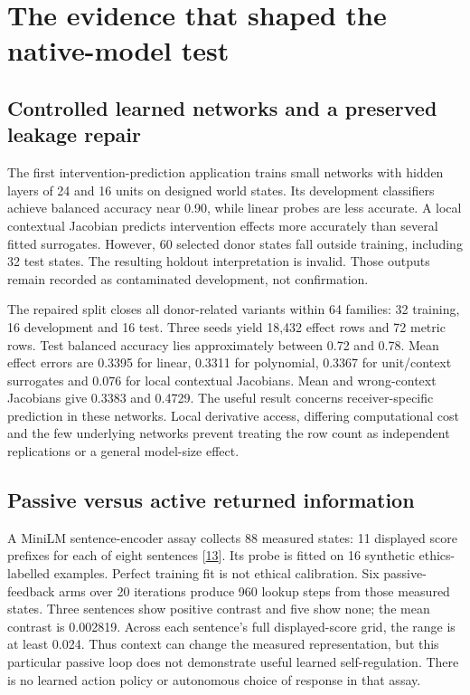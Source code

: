 \documentclass[11pt,letterpaper]{article}
\begin{document}
\section{The evidence that shaped the native-model test}

\subsection{Controlled learned networks and a preserved leakage repair}

The first intervention-prediction application trains small networks with hidden layers of 24 and 16 units on designed world states. Its development classifiers achieve balanced accuracy near 0.90, while linear probes are less accurate. A local contextual Jacobian predicts intervention effects more accurately than several fitted surrogates. However, 60 selected donor states fall outside training, including 32 test states. The resulting holdout interpretation is invalid. Those outputs remain recorded as contaminated development, not confirmation.

The repaired split closes all donor-related variants within 64 families: 32 training, 16 development and 16 test. Three seeds yield 18,432 effect rows and 72 metric rows. Test balanced accuracy lies approximately between 0.72 and 0.78. Mean effect errors are 0.3395 for linear, 0.3311 for polynomial, 0.3367 for unit/context surrogates and 0.076 for local contextual Jacobians. Mean and wrong-context Jacobians give 0.3383 and 0.4729. The useful result concerns receiver-specific prediction in these networks. Local derivative access, differing computational cost and the few underlying networks prevent treating the row count as independent replications or a general model-size effect.

\subsection{Passive versus active returned information}

A MiniLM sentence-encoder assay collects 88 measured states: 11 displayed score prefixes for each of eight sentences [\hyperref[ref:13]{13}]. Its probe is fitted on 16 synthetic ethics-labelled examples. Perfect training fit is not ethical calibration. Six passive-feedback arms over 20 iterations produce 960 lookup steps from those measured states. Three sentences show positive contrast and five show none; the mean contrast is 0.002819. Across each sentence's full displayed-score grid, the range is at least 0.024. Thus context can change the measured representation, but this particular passive loop does not demonstrate useful learned self-regulation. There is no learned action policy or autonomous choice of response in that assay.
\end{document}
